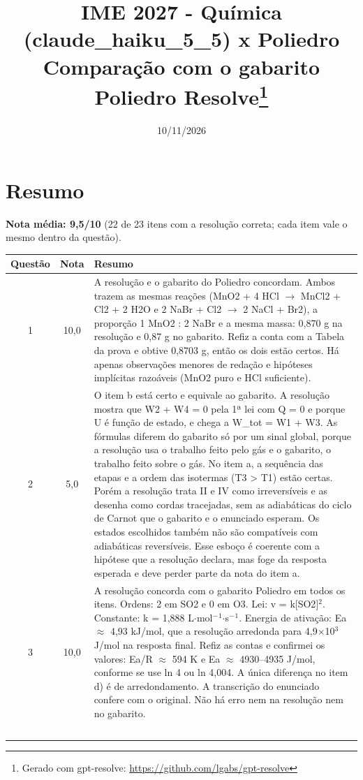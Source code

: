 \documentclass{article}%
\title{IME 2027 {-} Química (claude\_haiku\_5\_5) x Poliedro\\[4pt]\large Comparação com o gabarito Poliedro Resolve\thanks{Gerado com gpt-resolve: \url{https://github.com/lgabs/gpt-resolve}}}%
\date{10/11/2026}%
\begin{document}
%
\normalsize%
\maketitle%
\section*{Resumo}\textbf{Nota média: 9,5/10} (22 de 23 itens com a resolução correta; cada item vale o mesmo dentro da questão).\par\medskip%
\begin{longtable}{@{}c c p{}@{}}\toprule Questão & Nota & Resumo \\ \midrule
1 & 10,0 & A resolução e o gabarito do Poliedro concordam. Ambos trazem as mesmas reações (MnO2 + 4 HCl $\to$ MnCl2 + Cl2 + 2 H2O e 2 NaBr + Cl2 $\to$ 2 NaCl + Br2), a proporção 1 MnO2 : 2 NaBr e a mesma massa: 0,870 g na resolução e 0,87 g no gabarito. Refiz a conta com a Tabela da prova e obtive 0,8703 g, então os dois estão certos. Há apenas observações menores de redação e hipóteses implícitas razoáveis (MnO2 puro e HCl suficiente). \\
2 & 5,0 & O item b está certo e equivale ao gabarito. A resolução mostra que W2 + W4 = 0 pela 1ª lei com Q = 0 e porque U é função de estado, e chega a W\_tot = W1 + W3. As fórmulas diferem do gabarito só por um sinal global, porque a resolução usa o trabalho feito pelo gás e o gabarito, o trabalho feito sobre o gás. No item a, a sequência das etapas e a ordem das isotermas (T3 > T1) estão certas. Porém a resolução trata II e IV como irreversíveis e as desenha como cordas tracejadas, sem as adiabáticas do ciclo de Carnot que o gabarito e o enunciado esperam. Os estados escolhidos também não são compatíveis com adiabáticas reversíveis. Esse esboço é coerente com a hipótese que a resolução declara, mas foge da resposta esperada e deve perder parte da nota do item a. \\
3 & 10,0 & A resolução concorda com o gabarito Poliedro em todos os itens. Ordens: 2 em SO2 e 0 em O3. Lei: v = k{[}SO2{]}$^2$. Constante: k = 1,888 L$\cdot$mol$^{-}$$^{1}$$\cdot$s$^{-}$$^{1}$. Energia de ativação: Ea $\approx$ 4,93 kJ/mol, que a resolução arredonda para 4,9$\times$10$^3$ J/mol na resposta final. Refiz as contas e confirmei os valores: Ea/R $\approx$ 594 K e Ea $\approx$ 4930--4935 J/mol, conforme se use ln 4 ou ln 4,004. A única diferença no item d) é de arredondamento. A transcrição do enunciado confere com o original. Não há erro nem na resolução nem no gabarito. \\
$$
\end{longtable}
\end{document}
